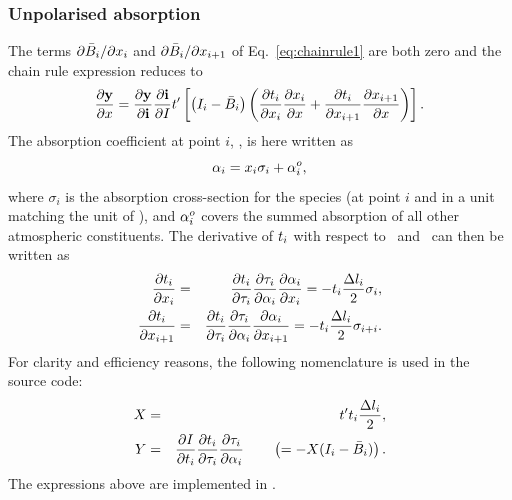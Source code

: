 \subsubsection{Unpolarised absorption}
%
The terms $\partial\bar{B}_i/\partial x_{i}$ and
$\partial\bar{B}_i/\partial x_{i+1}$ of Eq.~\ref{eq:chainrule1} are both
zero and the chain rule expression reduces to
\begin{displaymath}
  \frac{\partial\mathbf{y}}{\partial x} =  
  \frac{\partial\mathbf{y}}{\partial\mathbf{i}}
  \frac{\partial\mathbf{i}}{\partial I} t' \left[
      \left(I_{i}-\bar{B}_i\right)
      \left(
        \frac{\partial t_{i}}{\partial x_{i}}
        \frac{\partial x_{i}}{\partial x} + 
        \frac{\partial t_{i}}{\partial x_{i+1}}  
        \frac{\partial x_{i+1}}{\partial x} 
      \right) \right].
\end{displaymath}
The absorption coefficient at point $i$, , is here written as
\begin{equation}
  \label{eq:wfuns:crossec1}
  {\alpha}_{i} = x_{i}\sigma_i + {\alpha}_{i}^o,
\end{equation}
where $\sigma_i$ is the absorption cross-section for the species (at point $i$
and in a unit matching the unit of \SttElm), and ${\alpha}_{i}^o$ covers the
summed absorption of all other atmospheric constituents. The derivative of
$t_{i}$ with respect to \ and \ can then be written
as
\begin{eqnarray}
  \frac{\partial t_{i}}{\partial x_{i}} &=&
    \frac{\partial t_{i}}{\partial\tau_{i}}
    \frac{\partial\tau_{i}}{\partial{\alpha}_{i}}
    \frac{\partial{\alpha}_{i}}{\partial x_{i}} = 
    -t_{i}\frac{\Delta l_{i}}{2}\sigma_i, \\
  \frac{\partial t_{i}}{\partial x_{i+1}} &=& 
    \frac{\partial t_{i}}{\partial\tau_{i}}
    \frac{\partial\tau_{i}}{\partial{\alpha}_{i}}
    \frac{\partial{\alpha}_{i}}{\partial x_{i+1}} = 
    -t_{i}\frac{\Delta l_{i}}{2}\sigma_{i+i}.
\end{eqnarray}
For clarity and efficiency reasons, the following nomenclature is used in the
source code:
\begin{eqnarray}
  X &=& t' t_{i}\frac{\Delta l_{i}}{2}, \\
  Y &=& \frac{\partial I}{\partial t_{i}}
        \frac{\partial t_{i}}{\partial\tau_{i}}
        \frac{\partial\tau_{i}}{\partial{\alpha}_{i}}
    \qquad \left( = -X(I_{i}-\bar{B}_i) \right).
\end{eqnarray}
The expressions above are implemented in .


